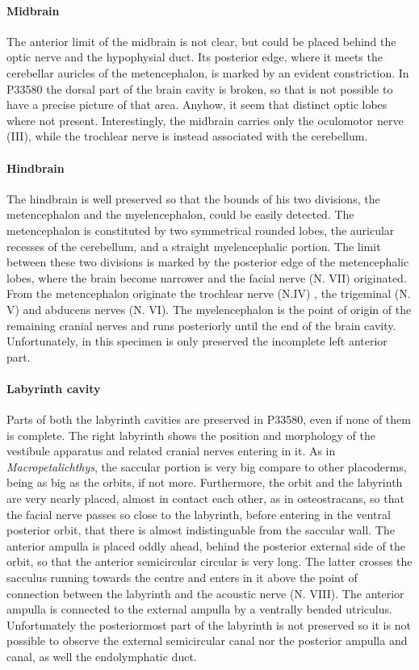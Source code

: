 \documentclass[12pt,letterpaper]{article}
\begin{document}
\paragraph{Midbrain}

The anterior limit of the midbrain is not clear, but could be placed behind the optic nerve and the hypophysial duct. Its posterior edge, where it meets the cerebellar auricles of the metencephalon, is marked by an evident constriction. In P33580 the dorsal part of the brain cavity is broken, so that is not possible to have a precise picture of that area. Anyhow, it seem that distinct optic lobes where not present. Interestingly, the midbrain carries only the oculomotor nerve (III), while the trochlear nerve is instead associated with the cerebellum.

\paragraph{Hindbrain}

The hindbrain is well preserved so that the bounds of his two divisions, the metencephalon and the myelencephalon, could be easily detected. The metencephalon is constituted by two symmetrical rounded lobes, the auricular recesses of the cerebellum, and a straight myelencephalic portion. The limit between these two divisions is marked by the posterior edge of the metencephalic lobes, where the brain become narrower and the facial nerve (N. VII) originated. From the metencephalon originate the trochlear nerve (N.IV) , the trigeminal (N. V) and abducens nerves (N. VI). The myelencephalon is the point of origin of the remaining cranial nerves and runs posteriorly until the end of the brain cavity. Unfortunately, in this specimen is only preserved the incomplete left  anterior part.

\paragraph{Labyrinth cavity}

Parts of both the labyrinth cavities are preserved in P33580, even if none of them is complete. The right labyrinth shows the position and morphology of the vestibule apparatus and related cranial nerves entering in it. As in \textit{Macropetalichthys}, the saccular portion is very big compare to other placoderms, being as big as the orbits, if not more.  Furthermore, the orbit and the labyrinth are very nearly placed, almost in contact each other, as in osteostracans, so that the facial nerve passes so close to the labyrinth, before entering in the ventral posterior orbit, that there is almost indistinguable from the saccular wall. 
The anterior ampulla is placed oddly ahead, behind the posterior external side of the orbit, so that the anterior semicircular circular is very long. The latter crosses the sacculus running towards the centre and enters in it above the point of connection between the labyrinth and the acoustic nerve (N. VIII). The anterior ampulla is connected to the external ampulla by a ventrally bended utriculus. Unfortunately the posteriormost part of the labyrinth is not preserved so it is not possible to observe the external semicircular canal nor the posterior ampulla and canal, as well the endolymphatic duct.
\end{document}

